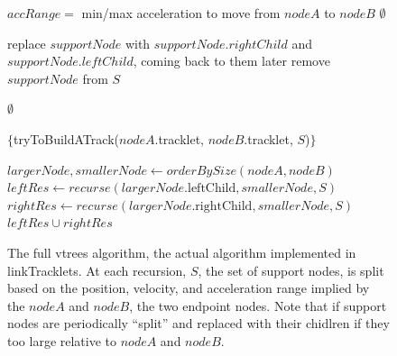 \begin{figure}[ht!]
\hrulefill
\begin{algorithmic}[5]

\State $accRange = $ min/max acceleration to move from $nodeA$ to $nodeB$
    \Return $\emptyset$
  \Else
  
    \State replace $supportNode$ with $supportNode.rightChild$ and $supportNode.leftChild$, coming back to them later
    \Else
      \State remove $supportNode$ from $S$
    \EndIf
  \EndIf

    \Return $\emptyset$ 
  \EndIf

  \EndFor

    \State {}

       \Return $\{$tryToBuildATrack($nodeA$.tracklet, $nodeB$.tracklet, $S$)$\}$
    \Else

       \State $largerNode, smallerNode \gets orderBySize(nodeA, nodeB)$
       \State $leftRes \gets recurse(largerNode.\text{leftChild}, smallerNode, S)$
       \State $rightRes \gets recurse(largerNode.\text{rightChild}, smallerNode, S)$
       \Return $ leftRes \cup rightRes $
  \EndIf
\EndIf

\end{algorithmic}
\hrulefill
\caption[linkTracklets pseudocode.]{The full vtrees algorithm, the actual algorithm implemented
  in linkTracklets.  At each recursion, $S$, the set of support nodes,
  is split based on the position, velocity, and acceleration range
  implied by the $nodeA$ and $nodeB$, the two endpoint nodes.  Note
  that if support nodes are periodically ``split'' and replaced with
  their chidlren if they too large relative to $nodeA$ and $nodeB$.}
 \label{linkTrackletsAlgorithm}
\end{figure}

